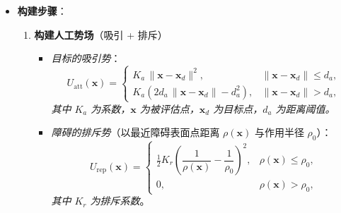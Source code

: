 \documentclass[../main.tex]{subfiles}
\begin{document}
\begin{enumerate}
\begin{itemize}
            \item \textbf{构建步骤}：
                \begin{enumerate}
                    \item \textbf{构建人工势场}（吸引 + 排斥）
                    \begin{itemize}
                        \item \textit{目标的吸引势}：
                        \[
                        U_{\mathrm{att}}(\mathbf{x})=
                        \begin{cases}
                            K_a\,\lVert \mathbf{x}-\mathbf{x}_d\rVert^2, & \lVert \mathbf{x}-\mathbf{x}_d\rVert \le d_a,\\[4pt]
                            K_a\!\left(2d_a\,\lVert \mathbf{x}-\mathbf{x}_d\rVert - d_a^2\right), & \lVert \mathbf{x}-\mathbf{x}_d\rVert > d_a,
                        \end{cases}
                        \]
                        \textit{其中 \(K_a\) 为系数，\(\mathbf{x}\) 为被评估点，\(\mathbf{x}_d\) 为目标点，\(d_a\) 为距离阈值。}
                        \item \textit{障碍的排斥势}（以最近障碍表面点距离 \(\rho(\mathbf{x})\) 与作用半径 \(\rho_0\)）：
                        \[
                        U_{\mathrm{rep}}(\mathbf{x})=
                        \begin{cases}
                            \tfrac{1}{2}K_r\!\left(\dfrac{1}{\rho(\mathbf{x})}-\dfrac{1}{\rho_0}\right)^{\!2}, & \rho(\mathbf{x}) \le \rho_0,\\[8pt]
                            0, & \rho(\mathbf{x}) > \rho_0,
                        \end{cases}
                        \]
                        \textit{其中 \(K_r\) 为排斥系数}。
                    \end{itemize}
                

\end{enumerate}
\end{itemize}
\end{enumerate}
\end{document}
